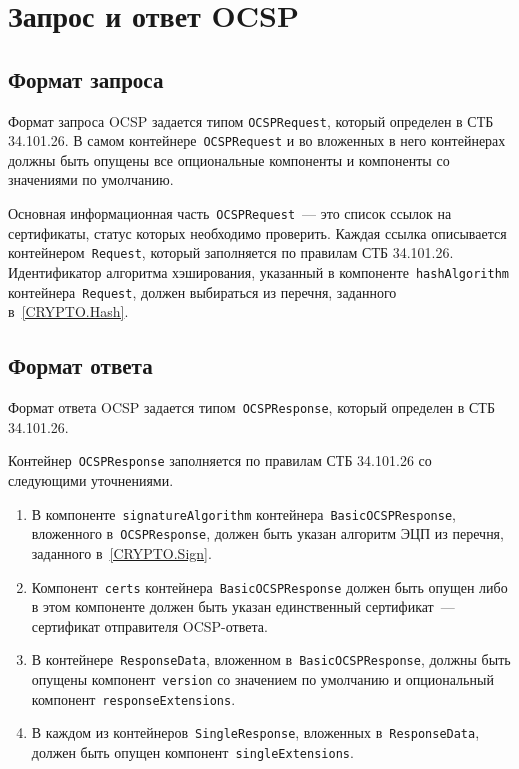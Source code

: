 \section{Запрос и ответ OCSP}\label{FMT.OCSP}

\subsection{Формат запроса}

Формат запроса OCSP задается типом \texttt{OCSPRequest}, который определен 
в СТБ 34.101.26. В самом контейнере~\texttt{OCSPRequest} и во вложенных в него
контейнерах должны быть опущены все опциональные компоненты и компоненты 
со значениями по умолчанию.

Основная информационная часть~\texttt{OCSPRequest}~--- это список ссылок
на сертификаты, статус которых необходимо проверить.
%
Каждая ссылка описывается контейнером~\texttt{Request}, который заполняется
по правилам СТБ 34.101.26. Идентификатор алгоритма хэширования, указанный в
компоненте~\texttt{hashAlgorithm} контейнера~\texttt{Request}, должен
выбираться из перечня, заданного в~\ref{CRYPTO.Hash}.

\subsection{Формат ответа}

Формат ответа OCSP задается типом~\texttt{OCSPResponse}, который определен 
в СТБ 34.101.26. 

Контейнер~\texttt{OCSPResponse} заполняется по правилам СТБ 34.101.26
со следующими уточнениями.

\begin{enumerate}
\item
В компоненте~\texttt{signatureAlgorithm} 
контейнера~\texttt{BasicOCSPResponse}, вложенного   
в~\texttt{OCSPResponse}, должен быть указан алгоритм ЭЦП
из перечня, заданного в~\ref{CRYPTO.Sign}.

\item
Компонент~\texttt{certs} контейнера~\texttt{BasicOCSPResponse}
должен быть опущен либо в этом компоненте должен быть указан 
единственный сертификат~--- сертификат отправителя OCSP-ответа.

\item
В контейнере~\texttt{ResponseData}, вложенном 
в~\texttt{BasicOCSPResponse}, должны быть опущены 
компонент~\texttt{version} со значением по умолчанию
и опциональный компонент~\texttt{responseExtensions}.

\item
В каждом из контейнеров~\texttt{SingleResponse}, вложенных
в~\texttt{ResponseData}, должен быть опущен 
компонент~\texttt{singleExtensions}.
\end{enumerate}
